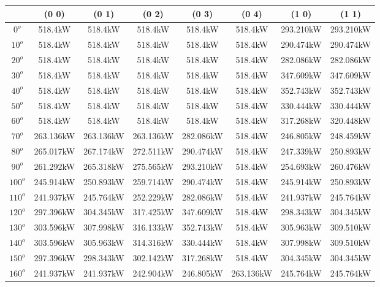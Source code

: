         \singlespacing
        \begin{table}[H]
        	\centering
        	\begin{tabular}{|c|c|c|c|c|c|c|c|} \hline
        			& (0 0)		& (0 1)		& (0 2)		& (0 3)		& (0 4)		& (1 0)		& (1 1)		\\ \hline
		$0^o$	& 518.4kW	& 518.4kW	& 518.4kW	& 518.4kW	& 518.4kW	& 293.210kW	& 293.210kW	\\ \hline
		$10^o$	& 518.4kW	& 518.4kW	& 518.4kW	& 518.4kW	& 518.4kW	& 290.474kW	& 290.474kW	\\ \hline
		$20^o$	& 518.4kW	& 518.4kW	& 518.4kW	& 518.4kW	& 518.4kW	& 282.086kW	& 282.086kW	\\ \hline
		$30^o$	& 518.4kW	& 518.4kW	& 518.4kW	& 518.4kW	& 518.4kW	& 347.609kW	& 347.609kW	\\ \hline
		$40^o$	& 518.4kW	& 518.4kW	& 518.4kW	& 518.4kW	& 518.4kW	& 352.743kW	& 352.743kW	\\ \hline
		$50^o$	& 518.4kW	& 518.4kW	& 518.4kW	& 518.4kW	& 518.4kW	& 330.444kW	& 330.444kW	\\ \hline
		$60^o$	& 518.4kW	& 518.4kW	& 518.4kW	& 518.4kW	& 518.4kW	& 317.268kW	& 320.448kW	\\ \hline
		$70^o$	& 263.136kW	& 263.136kW	& 263.136kW	& 282.086kW	& 518.4kW	& 246.805kW	& 248.459kW	\\ \hline
		$80^o$	& 265.017kW	& 267.174kW	& 272.511kW	& 290.474kW	& 518.4kW	& 247.339kW	& 250.893kW	\\ \hline
		$90^o$	& 261.292kW	& 265.318kW	& 275.565kW	& 293.210kW	& 518.4kW	& 254.693kW	& 260.476kW	\\ \hline
		$100^o$	& 245.914kW	& 250.893kW	& 259.714kW	& 290.474kW	& 518.4kW	& 245.914kW	& 250.893kW	\\ \hline
		$110^o$	& 241.937kW	& 245.764kW	& 252.229kW	& 282.086kW	& 518.4kW	& 241.937kW	& 245.764kW	\\ \hline
		$120^o$	& 297.396kW	& 304.345kW	& 317.425kW	& 347.609kW	& 518.4kW	& 298.343kW	& 304.345kW	\\ \hline
		$130^o$	& 303.596kW	& 307.998kW	& 316.133kW	& 352.743kW	& 518.4kW	& 305.963kW	& 309.510kW	\\ \hline
		$140^o$	& 303.596kW	& 305.963kW	& 314.316kW	& 330.444kW	& 518.4kW	& 307.998kW	& 309.510kW	\\ \hline
		$150^o$	& 297.396kW	& 298.343kW	& 302.142kW	& 317.268kW	& 518.4kW	& 304.345kW	& 304.345kW	\\ \hline
		$160^o$	& 241.937kW	& 241.937kW	& 242.904kW	& 246.805kW	& 263.136kW	& 245.764kW	& 245.764kW	\\ \hline

\end{tabular}
\end{table}
